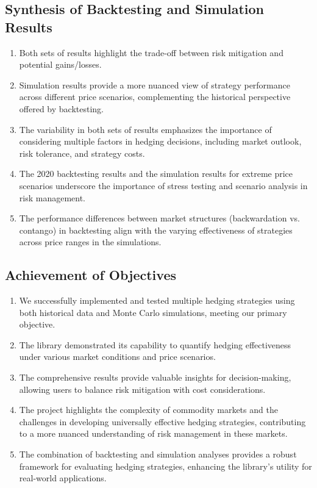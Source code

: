 \documentclass[12pt]{article}
\begin{document}
\subsection{Synthesis of Backtesting and Simulation Results}

\begin{enumerate}
    \item Both sets of results highlight the trade-off between risk mitigation and potential gains/losses.
    \item Simulation results provide a more nuanced view of strategy performance across different price scenarios, complementing the historical perspective offered by backtesting.
    \item The variability in both sets of results emphasizes the importance of considering multiple factors in hedging decisions, including market outlook, risk tolerance, and strategy costs.
    \item The 2020 backtesting results and the simulation results for extreme price scenarios underscore the importance of stress testing and scenario analysis in risk management.
    \item The performance differences between market structures (backwardation vs. contango) in backtesting align with the varying effectiveness of strategies across price ranges in the simulations.
\end{enumerate}

\subsection{Achievement of Objectives}

\begin{enumerate}
    \item We successfully implemented and tested multiple hedging strategies using both historical data and Monte Carlo simulations, meeting our primary objective.
    \item The library demonstrated its capability to quantify hedging effectiveness under various market conditions and price scenarios.
    \item The comprehensive results provide valuable insights for decision-making, allowing users to balance risk mitigation with cost considerations.
    \item The project highlights the complexity of commodity markets and the challenges in developing universally effective hedging strategies, contributing to a more nuanced understanding of risk management in these markets.
    \item The combination of backtesting and simulation analyses provides a robust framework for evaluating hedging strategies, enhancing the library's utility for real-world applications.
\end{enumerate}
\end{document}
